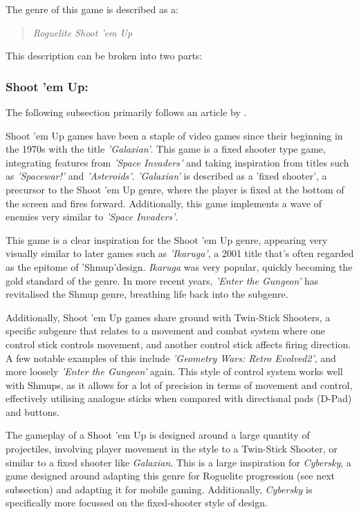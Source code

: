 \documentclass{scrartcl}
\let\cite\textcite
\begin{document}
The genre of this game is described as a:

\begin{quote}
  \emph{Roguelite Shoot 'em Up}
\end{quote}

This description can be broken into two parts:

\subsubsection{Shoot 'em Up:}

The following subsection primarily follows an article by \cite{BrianW2020-01}.

Shoot 'em Up games have been a staple of video games since their beginning in the 1970s with the title \emph{'Galaxian'}. This game is a fixed shooter type game, integrating features from \emph{'Space Invaders'} and taking inspiration from titles such as \emph{'Spacewar!'} and \emph{'Asteroids'}. \emph{'Galaxian'} is described as a 'fixed shooter', a precursor to the Shoot 'em Up genre, where the player is fixed at the bottom of the screen and fires forward. Additionally, this game implements a wave of enemies very similar to \emph{'Space Invaders'}.

This game is a clear inspiration for the Shoot 'em Up genre, appearing very visually similar to later games such as \emph{'Ikaruga'}, a 2001 title that's often regarded as the epitome of 'Shmup'design. \emph{Ikaruga} was very popular, quickly becoming the gold standard of the genre. In more recent years, \emph{'Enter the Gungeon'} has revitalised the Shmup genre, breathing life back into the subgenre.

Additionally, Shoot 'em Up games share ground with Twin-Stick Shooters, a specific subgenre that relates to a movement and combat system where one control stick controls movement, and another control stick affects firing direction. A few notable examples of this include \emph{'Geometry Wars: Retro Evolved2'}, and more loosely \emph{'Enter the Gungeon'} again. This style of control system works well with Shmups, as it allows for a lot of precision in terms of movement and control, effectively utilising analogue sticks when compared with directional pads (D-Pad) and buttons.

The gameplay of a Shoot 'em Up is designed around a large quantity of projectiles, involving player movement in the style to a Twin-Stick Shooter, or similar to a fixed shooter like \emph{Galaxian}. This is a large inspiration for \emph{Cybersky}, a game designed around adapting this genre for Roguelite progression (see next subsection) and adapting it for mobile gaming. Additionally, \emph{Cybersky} is specifically more focussed on the fixed-shooter style of design.
\end{document}
